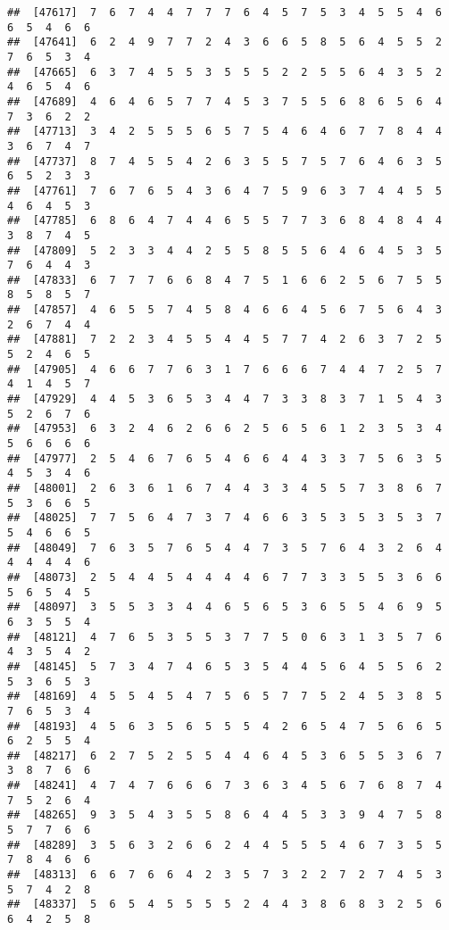 \documentclass[
]{book}
\begin{document}
\begin{verbatim}
##  [47617]  7  6  7  4  4  7  7  7  6  4  5  7  5  3  4  5  5  4  6  6  5  4  6  6
##  [47641]  6  2  4  9  7  7  2  4  3  6  6  5  8  5  6  4  5  5  2  7  6  5  3  4
##  [47665]  6  3  7  4  5  5  3  5  5  5  2  2  5  5  6  4  3  5  2  4  6  5  4  6
##  [47689]  4  6  4  6  5  7  7  4  5  3  7  5  5  6  8  6  5  6  4  7  3  6  2  2
##  [47713]  3  4  2  5  5  5  6  5  7  5  4  6  4  6  7  7  8  4  4  3  6  7  4  7
##  [47737]  8  7  4  5  5  4  2  6  3  5  5  7  5  7  6  4  6  3  5  6  5  2  3  3
##  [47761]  7  6  7  6  5  4  3  6  4  7  5  9  6  3  7  4  4  5  5  4  6  4  5  3
##  [47785]  6  8  6  4  7  4  4  6  5  5  7  7  3  6  8  4  8  4  4  3  8  7  4  5
##  [47809]  5  2  3  3  4  4  2  5  5  8  5  5  6  4  6  4  5  3  5  7  6  4  4  3
##  [47833]  6  7  7  7  6  6  8  4  7  5  1  6  6  2  5  6  7  5  5  8  5  8  5  7
##  [47857]  4  6  5  5  7  4  5  8  4  6  6  4  5  6  7  5  6  4  3  2  6  7  4  4
##  [47881]  7  2  2  3  4  5  5  4  4  5  7  7  4  2  6  3  7  2  5  5  2  4  6  5
##  [47905]  4  6  6  7  7  6  3  1  7  6  6  6  7  4  4  7  2  5  7  4  1  4  5  7
##  [47929]  4  4  5  3  6  5  3  4  4  7  3  3  8  3  7  1  5  4  3  5  2  6  7  6
##  [47953]  6  3  2  4  6  2  6  6  2  5  6  5  6  1  2  3  5  3  4  5  6  6  6  6
##  [47977]  2  5  4  6  7  6  5  4  6  6  4  4  3  3  7  5  6  3  5  4  5  3  4  6
##  [48001]  2  6  3  6  1  6  7  4  4  3  3  4  5  5  7  3  8  6  7  5  3  6  6  5
##  [48025]  7  7  5  6  4  7  3  7  4  6  6  3  5  3  5  3  5  3  7  5  4  6  6  5
##  [48049]  7  6  3  5  7  6  5  4  4  7  3  5  7  6  4  3  2  6  4  4  4  4  4  6
##  [48073]  2  5  4  4  5  4  4  4  4  6  7  7  3  3  5  5  3  6  6  5  6  5  4  5
##  [48097]  3  5  5  3  3  4  4  6  5  6  5  3  6  5  5  4  6  9  5  6  3  5  5  4
##  [48121]  4  7  6  5  3  5  5  3  7  7  5  0  6  3  1  3  5  7  6  4  3  5  4  2
##  [48145]  5  7  3  4  7  4  6  5  3  5  4  4  5  6  4  5  5  6  2  5  3  6  5  3
##  [48169]  4  5  5  4  5  4  7  5  6  5  7  7  5  2  4  5  3  8  5  7  6  5  3  4
##  [48193]  4  5  6  3  5  6  5  5  5  4  2  6  5  4  7  5  6  6  5  6  2  5  5  4
##  [48217]  6  2  7  5  2  5  5  4  4  6  4  5  3  6  5  5  3  6  7  3  8  7  6  6
##  [48241]  4  7  4  7  6  6  6  7  3  6  3  4  5  6  7  6  8  7  4  7  5  2  6  4
##  [48265]  9  3  5  4  3  5  5  8  6  4  4  5  3  3  9  4  7  5  8  5  7  7  6  6
##  [48289]  3  5  6  3  2  6  6  2  4  4  5  5  5  4  6  7  3  5  5  7  8  4  6  6
##  [48313]  6  6  7  6  6  4  2  3  5  7  3  2  2  7  2  7  4  5  3  5  7  4  2  8
##  [48337]  5  6  5  4  5  5  5  5  2  4  4  3  8  6  8  3  2  5  6  6  4  2  5  8

\end{verbatim}
\end{document}
